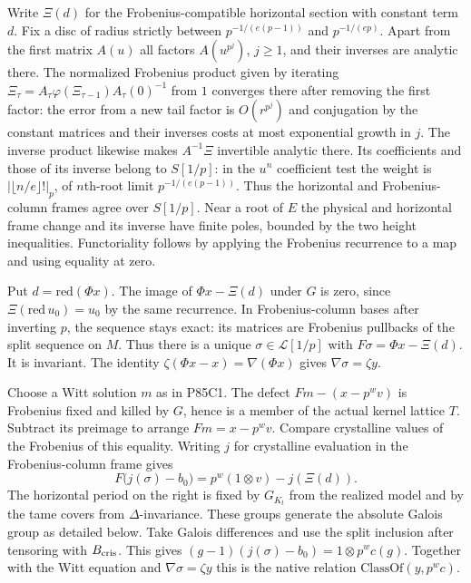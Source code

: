 Write $\Xi(d)$ for the Frobenius-compatible horizontal section
with constant term $d$. Fix a disc of radius strictly between
$p^{-1/(e(p-1))}$ and $p^{-1/(ep)}$. Apart from the first
matrix $A(u)$ all factors $A(u^{p^j})$, $j\ge1$, and their
inverses are analytic there. The normalized Frobenius product
given by iterating
$\Xi_\tau=A_\tau\varphi(\Xi_{\tau-1})A_\tau(0)^{-1}$ from $1$
converges there after removing the first factor: the error from
a new tail factor is $O(r^{p^j})$ and conjugation by the
constant matrices and their inverses costs at most exponential
growth in $j$. The inverse product likewise makes
$A^{-1}\Xi$ invertible analytic there. Its coefficients and those
of its inverse belong to $S[1/p]$: in the $u^n$ coefficient test
the weight is $|\lfloor n/e\rfloor!|_p$, of $n$th-root limit
$p^{-1/(e(p-1))}$. Thus the horizontal and Frobenius-column
frames agree over $S[1/p]$. Near a root of $E$ the physical and
horizontal frame change and its inverse have finite poles, bounded
by the two height inequalities. Functoriality follows by applying
the Frobenius recurrence to a map and using equality at zero.

Put $d=\mathrm{red}(\Phi x)$. The image of $\Phi x-\Xi(d)$
under $G$ is zero, since $\Xi(\mathrm{red}\,u_0)=u_0$ by the
same recurrence. In Frobenius-column bases after inverting $p$,
the sequence stays exact: its matrices are Frobenius pullbacks
of the split sequence on $M$. Thus there is a unique
$\sigma\in\mathcal L[1/p]$ with $F\sigma=\Phi x-\Xi(d)$.
It is invariant. The identity $\zeta(\Phi x-x)=\nabla(\Phi x)$
gives $\nabla\sigma=\zeta y$.

Choose a Witt solution $m$ as in P85C1. The defect
$Fm-(x-p^wv)$ is Frobenius fixed and killed by $G$, hence
is a member of the actual kernel lattice $T$. Subtract its
preimage to arrange $Fm=x-p^wv$. Compare crystalline
values of the Frobenius of this equality. Writing $j$ for
crystalline evaluation in the Frobenius-column frame gives
\[
   F\big(j(\sigma)-b_0\big)=p^w(1\otimes v)-j(\Xi(d)).
\]
The horizontal period on the right is fixed by $G_{K_t}$
from the realized model and by the tame covers from
$\Delta$-invariance. These groups generate the absolute
Galois group as detailed below. Take Galois differences and use
the split inclusion after tensoring with $B_{\rm cris}$. This gives
$(g-1)(j(\sigma)-b_0)=1\otimes p^w c(g)$. Together with the
Witt equation and $\nabla\sigma=\zeta y$ this is the native
relation $\mathrm{ClassOf}(y,p^w c)$.

